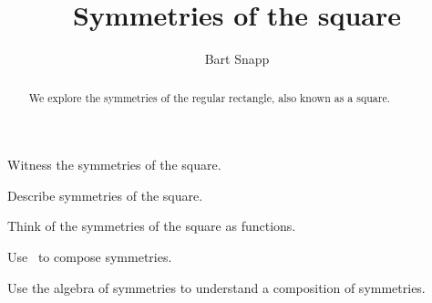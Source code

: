 \documentclass[noauthor,nooutcomes,hints]{ximera}
\title{Symmetries of the square}
\author{Bart Snapp}
\begin{document}
\begin{abstract}
  We explore the symmetries of the regular rectangle, also known as a
  square.
\end{abstract}
\maketitle

\begin{listOutcomes}
\item Witness the symmetries of the square.
\item Describe symmetries of the square.
\item Think of the symmetries of the square as functions.
\item Use \snap\ to compose symmetries.
\item Use the algebra of symmetries to understand a composition of
  symmetries.
\end{listOutcomes}
\mynewpage
\end{document}
